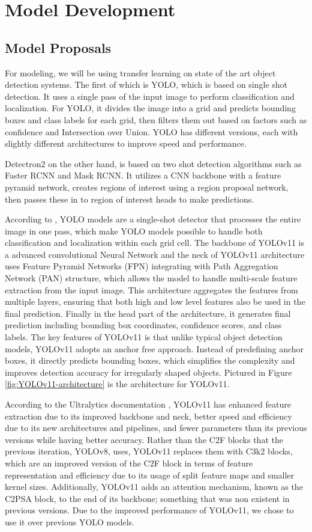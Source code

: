 \documentclass[stu,12pt,floatsintext]{apa7}
\begin{document}
\section{Model Development}
\subsection{Model Proposals}
For modeling, we will be using transfer learning on state of the art object detection systems. The first of which is YOLO, which is based on single shot detection. It uses a single pass of the input image to perform classification and localization. For YOLO, it divides the image into a grid and predicts bounding boxes and class labels for each grid, then filters them out based on factors such as confidence and Intersection over Union. YOLO has different versions, each with slightly different architectures to improve speed and performance.

Detectron2 on the other hand, is based on two shot detection algorithms such as Faster RCNN and Mask RCNN. It utilizes a CNN backbone with a feature pyramid network, creates regions of interest using a region proposal network, then passes these in to region of interest heads to make predictions.

According to \textcite{yaseen_what_2024}, YOLO models are a single-shot detector that processes the entire image in one pass, which make YOLO models possible to handle both classification and localization within each grid cell. The backbone of YOLOv11 is a advanced convolutional Neural Network and the neck of YOLOv11 architecture uses Feature Pyramid Networks (FPN) integrating with Path Aggregation Network (PAN) structure, which allows the model to handle multi-scale feature extraction from the input image. This architecture aggregates the features from multiple layers, ensuring that both high and low level features also be used in the final prediction. Finally in the head part of the architecture, it generates final prediction including bounding box coordinates, confidence scores, and class labels. The key features of YOLOv11 is that unlike typical object detection models, YOLOv11 adopts an anchor free approach. Instead of predefining anchor boxes, it directly predicts bounding boxes, which simplifies the complexity and improves detection accuracy for irregularly shaped objects. Pictured in Figure \ref{fig:YOLOv11-architecture} is the architecture for YOLOv11. 

According to the Ultralytics documentation \parencite{yolo11_ultralytics}, YOLOv11 has enhanced feature extraction due to its improved backbone and neck, better speed and efficiency due to its new architectures and pipelines, and fewer parameters than its previous versions while having better accuracy. Rather than the C2F blocks that the previous iteration, YOLOv8, uses, YOLOv11 replaces them with C3k2 blocks, which are an improved version of the C2F block in terms of feature representation and efficiency due to its usage of split feature maps and smaller kernel sizes. Additionally, YOLOv11 adds an attention mechanism, known as the C2PSA block, to the end of its backbone; something that was non existent in previous versions. Due to the improved performance of YOLOv11, we chose to use it over previous YOLO models.
\end{document}
